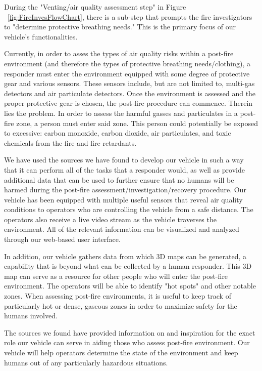 During the "Venting/air quality assessment step" in Figure ~\ref{fig:FireInvesFlowChart}, there is a sub-step that prompts the fire investigators to "determine protective breathing needs."\cite{nfpa} This is the primary focus of our vehicle's functionalities.

Currently, in order to asses the types of air quality risks within a post-fire environment (and therefore the types of protective breathing needs/clothing), a responder must enter the environment equipped with some degree of protective gear and various sensors. These sensors include, but are not limited to, multi-gas detectors and air particulate detectors.\cite{evaluationofhazards} Once the environment is assessed and the proper protective gear is chosen, the post-fire procedure can commence. Therein lies the problem. In order to assess the harmful gasses and particulates in a post-fire zone, a person must enter said zone. This person could potentially be exposed to excessive: carbon monoxide, carbon dioxide, air particulates, and toxic chemicals from the fire and fire retardants. \cite{toxichazards}


We have used the sources we have found to develop our vehicle in such a way that it can perform all of the tasks that a responder would, as well as provide additional data that can be used to further ensure that no humans will be harmed during the post-fire assessment/investigation/recovery procedure. 
Our vehicle has been equipped with multiple useful sensors that reveal air quality conditions to operators who are controlling the vehicle from a safe distance. The operators also receive a live video stream as the vehicle traverses the environment. All of the relevant information can be visualized and analyzed through our web-based user interface. 

In addition, our vehicle gathers data from which 3D maps can be generated, a capability that is beyond what can be collected by a human responder. This 3D map can serve as a resource for other people who will enter the post-fire environment. The operators will be able to identify "hot spots" and other notable zones. When assessing post-fire environments, it is useful to keep track of particularly hot or dense, gaseous zones in order to maximize safety for the humans involved. \cite{recoveringfromwildfire}

The sources we found have provided information on and inspiration for the exact role our vehicle can serve in aiding those who assess post-fire environment. Our vehicle will help operators determine the state of the environment and keep humans out of any particularly hazardous situations. 









